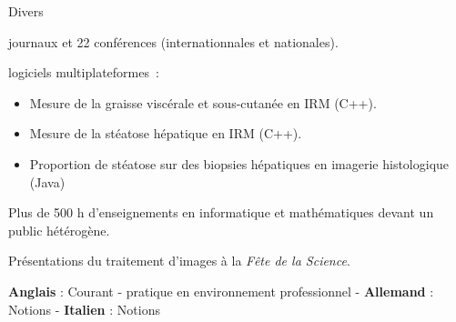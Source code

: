 \begin{rubric}{Divers}

   journaux et 22 conférences
  (internationnales et nationales).

   logiciels multiplateformes~: 
  \begin{itemize}
  \item Mesure de la graisse viscérale et sous-cutanée en IRM (C++).
  \item Mesure de la stéatose hépatique en IRM (C++).
  \item Proportion de stéatose sur des biopsies hépatiques en imagerie
    histologique (Java)
  \end{itemize}

  \entry*[Transmission]  Plus de 500 h d'enseignements en informatique et
  mathématiques devant un public hétérogène. 

  \entry*[Vulgarisation] Présentations du traitement d'images à la \emph{Fête de la Science}. 
  
   \textbf{Anglais} : Courant - pratique en environnement professionnel - \textbf{Allemand} : Notions - \textbf{Italien} : Notions







\end{rubric}
